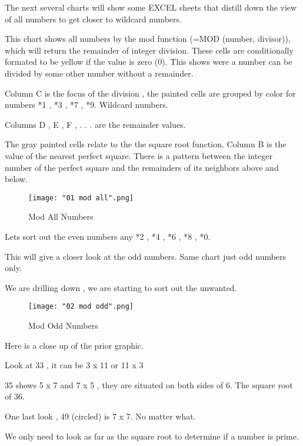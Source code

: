 \documentclass[12pt,letterpaper,oneside,titlepage]{article}
\begin{document}
\par 
\tab The next several charts will show some EXCEL sheets that distill down the view of all numbers to get closer to wild\textendash card numbers.
\\
\par This chart shows all numbers by the mod function (=MOD (number, divisor)), which will return the remainder of integer division. These cells are conditionally formated to be yellow if the value is zero (0). This shows were a number can be divided by some other number without a remainder. 
\\
\par Column C is the focus of the division , the painted cells are grouped by color for numbers *1 , *3 , *7 , *9. Wild\textendash card numbers.
\\
\par Columns D , E , F , . . . are the remainder values. 
\\
\par The gray painted cells relate to the the square root function. Column B is the value of the nearest perfect square. There is a pattern  between the integer number of the perfect square and the remainders  of its neighbors above and below.
\begin{figure}[h]
	\centering
	\texttt{[image: "01 mod all".png]}
	\caption{Mod All Numbers}
\end{figure}
\pagebreak  


\par 
Lets sort out the even numbers any *2 , *4  , *6 , *8 , *0.
\\
\par 
This will give a closer look at the odd numbers. Same chart just odd numbers only.
\\
\par We are drilling down , we are starting to sort out the unwanted.
\begin{figure}[h]
	\centering
	\texttt{[image: "02 mod odd".png]}
	\caption{Mod Odd Numbers}
\end{figure}
\pagebreak  

\par 
Here is a close up of the prior graphic. 
\\
\par 
Look at 33 , it can be 3 x 11 or 11 x 3
\\
\par 
35 shows 5 x 7 and 7 x 5 , they are situated on both sides of 6. The square root of 36.
\\
\par 
One last look , 49 (circled) is 7 x 7. No matter what.
\\
\par 
We only need to look as far as the square root to determine if a number is prime.
\end{document}
